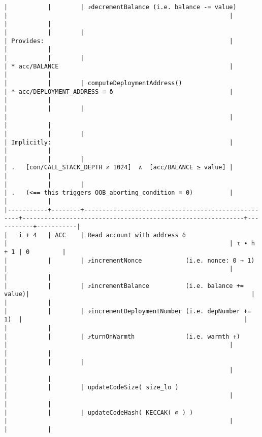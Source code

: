 \documentclass[varwidth=\maxdimen,margin=0.5cm,multi={verbatim}]{standalone}
\begin{document}
\begin{verbatim}
|           |        | ⤴️decrementBalance (i.e. balance -= value)         |                                                             |           |           |
|           |        |                                                    | Provides:                                                   |           |           |
|           |        |                                                    | * acc/BALANCE                                               |           |           |
|           |        | computeDeploymentAddress()                         | * acc/DEPLOYMENT_ADDRESS ≡ δ                                |           |           |
|           |        |                                                    |                                                             |           |           |
|           |        |                                                    | Implicitly:                                                 |           |           |
|           |        |                                                    | .   [con/CALL_STACK_DEPTH ≠ 1024]  ∧  [acc/BALANCE ≥ value] |           |           |
|           |        |                                                    | .   (<== this triggers OOB_aborting_condition ≡ 0)          |           |           |
|-----------+--------+----------------------------------------------------+-------------------------------------------------------------+-----------+-----------|
|   i + 4   | ACC    | Read account with address δ                        |                                                             | τ ∙ h + 1 | 0         |
|           |        | ⤴️incrementNonce            (i.e. nonce: 0 → 1)    |                                                             |           |           |
|           |        | ⤴️incrementBalance          (i.e. balance += value)|                                                             |           |           |
|           |        | ⤴️incrementDeploymentNumber (i.e. depNumber += 1)  |                                                             |           |           |
|           |        | ⤴️turnOnWarmth              (i.e. warmth ↑)        |                                                             |           |           |
|           |        |                                                    |                                                             |           |           |
|           |        | updateCodeSize( size_lo )                          |                                                             |           |           |
|           |        | updateCodeHash( KECCAK( ∅ ) )                      |                                                             |           |           |

\end{verbatim}
\end{document}
